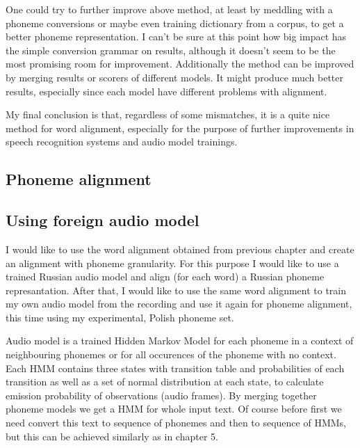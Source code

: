 \documentclass[12pt,a4paper,english]{article}
\begin{document}
One could try to further improve above method, at least by meddling with a phoneme conversions or maybe even training dictionary from a corpus, to get a better phoneme representation. I can't be sure at this point how big impact has the simple conversion grammar on results, although it doesn't seem to be the most promising room for improvement.  Additionally the method can be improved by merging results or scorers of different models. It might produce much better results, especially since each model have different problems with alignment. \newline

My final conclusion is that, regardless of some mismatches, it is a quite nice method for word alignment, especially for the purpose of further improvements in speech recognition systems and audio model trainings.

\newpage
\begin{center}
    \section{Phoneme alignment}
\end {center}
\setcounter{equation}{0}

\subsection{Using foreign audio model}

I would like to use the word alignment obtained from previous chapter and create an alignment with phoneme granularity. For this purpose I would like to use a trained Russian audio model and align (for each word) a Russian phoneme represantation. After that, I would like to use the same word alignment to train my own audio model from the recording and use it again for phoneme alignment, this time using my experimental, Polish phoneme set. \newline

Audio model is a trained Hidden Markov Model for each phoneme in a context of neighbouring phonemes or for all occurences of the phoneme with no context. Each HMM contains three states with transition table and probabilities of each transition as well as a set of normal distribution at each state, to calculate emission probability of observations (audio frames). \newline
By merging together phoneme models we get a HMM for whole input text. Of course before first we need convert this text to sequence of phonemes and then to sequence of HMMs, but this can be achieved similarly as in chapter 5. \newline
\end{document}
